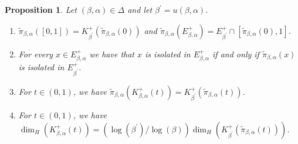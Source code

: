 \documentclass[a4paper,reqno,10pt]{amsart}
\newtheorem{proposition}[theorem]{Proposition}
\begin{document}
\begin{proposition}\label{prop:char}
Let $(\beta,\alpha)\in\Delta$ and let $\beta^\prime=u(\beta,\alpha)$.
    \begin{enumerate}
        \item  $\tilde{\pi}_{\beta,\alpha}([0,1])=K_{\beta^\prime}^+(\tilde{\pi}_{\beta,\alpha}(0))$ and $\tilde{\pi}_{\beta,\alpha}(E_{\beta,\alpha}^+)=E_{\beta^\prime}^+\cap[\tilde{\pi}_{\beta,\alpha}(0),1]$.
        \item For every $x\in E_{\beta,\alpha}^+$ we have that $x$ is isolated in $E_{\beta,\alpha}^+$ if and only if $\tilde{\pi}_{\beta,\alpha}(x)$ is isolated in $E_{\beta^\prime}^+$.
        \item For $t\in(0,1)$, we have $ \tilde{\pi}_{\beta,\alpha}(K_{\beta,\alpha}^+(t))=K_{\beta^\prime}^+(\tilde{\pi}_{\beta,\alpha}(t)) $.
        \item For $t\in(0,1)$, we have $\dim_H(K_{\beta,\alpha}^+(t))=(\log(\beta^\prime)/\log(\beta)) \dim_H(K_{\beta^\prime}^+(\tilde{\pi}_{\beta,\alpha}(t)))$.
    \end{enumerate}
\end{proposition}

\newpage
\end{document}
